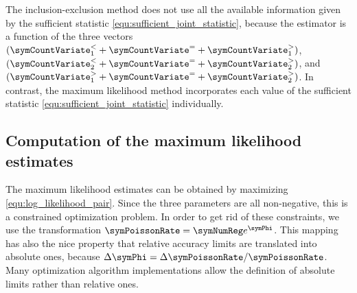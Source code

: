 \documentclass[a4paper]{scrartcl}
\begin{document}

The inclusion-exclusion method does not use all the available information given by the sufficient statistic \eqref{equ:sufficient_joint_statistic}, because the estimator is a function of the three vectors $(\boldsymbol\symCountVariate^{<}_{1} + \boldsymbol\symCountVariate^{=} + \boldsymbol\symCountVariate^{>}_{1})$, 
$(\boldsymbol\symCountVariate^{<}_{2} + \boldsymbol\symCountVariate^{=} + \boldsymbol\symCountVariate^{>}_{2})$, and 
$(\boldsymbol\symCountVariate^{>}_{1} + \boldsymbol\symCountVariate^{=} + \boldsymbol\symCountVariate^{>}_{2})$. In contrast, the maximum likelihood method incorporates each value of the sufficient statistic \eqref{equ:sufficient_joint_statistic} individually.

\subsection{Computation of the maximum likelihood estimates}
The maximum likelihood estimates can be obtained by maximizing \eqref{equ:log_likelihood_pair}. Since the three parameters are all non-negative, this is a constrained optimization problem. In order to get rid of these constraints, we use the transformation $\symPoissonRate=\symNumReg e^{\symPhi}$. This mapping has also the nice property that relative accuracy limits are translated into absolute ones, because $\Delta\symPhi = \Delta\symPoissonRate/\symPoissonRate$. Many optimization algorithm implementations allow the definition of absolute limits rather than relative ones.
\end{document}
